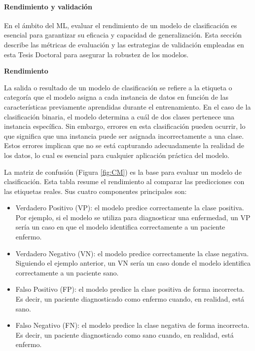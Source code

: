 \paragraph{Rendimiento y validación}

En el ámbito del ML, evaluar el rendimiento de un modelo de clasificación es esencial para garantizar su eficacia y capacidad de generalización. Esta sección describe las métricas de evaluación y las estrategias de validación empleadas en esta Tesis Doctoral para asegurar la robustez de los modelos.

\textbf{Rendimiento}

La salida o resultado de un modelo de clasificación se refiere a la etiqueta o categoría que el modelo asigna a cada instancia de datos en función de las características previamente aprendidas durante el entrenamiento. En el caso de la clasificación binaria, el modelo determina a cuál de dos clases pertenece una instancia específica. Sin embargo, errores en esta clasificación pueden ocurrir, lo que significa que una instancia puede ser asignada incorrectamente a una clase. Estos errores implican que no se está capturando adecuadamente la realidad de los datos, lo cual es esencial para cualquier aplicación práctica del modelo.

La matriz de confusión (Figura \ref{fig:CM}) es la base para evaluar un modelo de clasificación. Esta tabla resume el rendimiento al comparar las predicciones con las etiquetas reales. Sus cuatro componentes principales son:

\begin{itemize}
\item Verdadero Positivo (VP): el modelo predice correctamente la clase positiva. Por ejemplo, si el modelo se utiliza para diagnosticar una enfermedad, un VP sería un caso en que el modelo identifica correctamente a un paciente enfermo.

\item Verdadero Negativo (VN): el modelo predice correctamente la clase negativa. Siguiendo el ejemplo anterior, un VN sería un caso donde el modelo identifica correctamente a un paciente sano.

\item Falso Positivo (FP): el modelo predice la clase positiva de forma incorrecta. Es decir, un paciente diagnosticado como enfermo cuando, en realidad, está sano.

\item Falso Negativo (FN): el modelo predice la clase negativa de forma incorrecta. Es decir, un paciente diagnosticado como sano cuando, en realidad, está enfermo.


\end{itemize}

